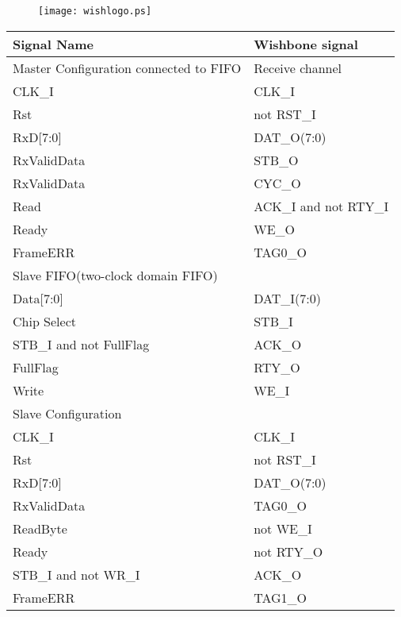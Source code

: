 \documentclass[a4paper,11pt]{article}
\begin{document}
\begin{figure}[!h]
\texttt{[image: wishlogo.ps]}
\label{Logo}
\end{figure}

\begin{tabular}{|l|l|}
\hline
Signal Name& Wishbone signal\\
\hline
\hline
Master Configuration connected to FIFO& Receive channel\\
\hline
CLK\_I & CLK\_I\\
Rst & not RST\_I\\
RxD[7:0]& DAT\_O(7:0)\\
RxValidData& STB\_O\\
RxValidData& CYC\_O\\
Read& ACK\_I and not RTY\_I\\
Ready& WE\_O\\
FrameERR& TAG0\_O\\
\hline

Slave FIFO(two-clock domain FIFO)&\\
\hline
Data[7:0]& DAT\_I(7:0)\\
Chip Select& STB\_I\\
STB\_I and not FullFlag& ACK\_O\\
FullFlag& RTY\_O\\
Write& WE\_I\\
\hline

Slave Configuration &\\
\hline

CLK\_I & CLK\_I\\
Rst & not RST\_I\\
RxD[7:0]& DAT\_O(7:0)\\
RxValidData& TAG0\_O\\
ReadByte& not WE\_I\\
Ready& not RTY\_O\\
STB\_I and not WR\_I& ACK\_O\\
FrameERR& TAG1\_O\\
\hline

\end{tabular}
\end{document}
